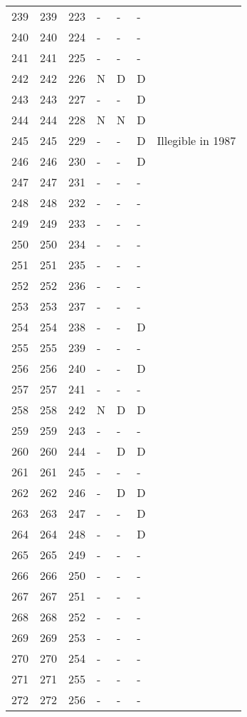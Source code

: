 \begin{longtable}{rrrllll}
  239 & 239 & 223 & - & - & - &  \\ 
  240 & 240 & 224 & - & - & - &  \\ 
  241 & 241 & 225 & - & - & - &  \\ 
  242 & 242 & 226 & N & D & D &  \\ 
  243 & 243 & 227 & - & - & D &  \\ 
  244 & 244 & 228 & N & N & D &  \\ 
  245 & 245 & 229 & - & - & D & Illegible in 1987 \\ 
  246 & 246 & 230 & - & - & D &  \\ 
  247 & 247 & 231 & - & - & - &  \\ 
  248 & 248 & 232 & - & - & - &  \\ 
  249 & 249 & 233 & - & - & - &  \\ 
  250 & 250 & 234 & - & - & - &  \\ 
  251 & 251 & 235 & - & - & - &  \\ 
  252 & 252 & 236 & - & - & - &  \\ 
  253 & 253 & 237 & - & - & - &  \\ 
  254 & 254 & 238 & - & - & D &  \\ 
  255 & 255 & 239 & - & - & - &  \\ 
  256 & 256 & 240 & - & - & D &  \\ 
  257 & 257 & 241 & - & - & - &  \\ 
  258 & 258 & 242 & N & D & D &  \\ 
  259 & 259 & 243 & - & - & - &  \\ 
  260 & 260 & 244 & - & D & D &  \\ 
  261 & 261 & 245 & - & - & - &  \\ 
  262 & 262 & 246 & - & D & D &  \\ 
  263 & 263 & 247 & - & - & D &  \\ 
  264 & 264 & 248 & - & - & D &  \\ 
  265 & 265 & 249 & - & - & - &  \\ 
  266 & 266 & 250 & - & - & - &  \\ 
  267 & 267 & 251 & - & - & - &  \\ 
  268 & 268 & 252 & - & - & - &  \\ 
  269 & 269 & 253 & - & - & - &  \\ 
  270 & 270 & 254 & - & - & - &  \\ 
  271 & 271 & 255 & - & - & - &  \\ 
  272 & 272 & 256 & - & - & - &  \\ 

\end{longtable}
